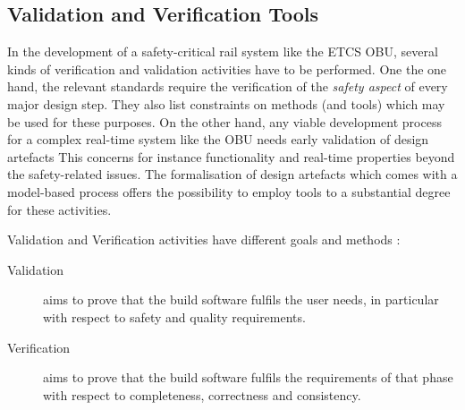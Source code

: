 \documentclass{template/openetcs_article}
\begin{document}
\subsection{Validation and Verification Tools}

In the development of a safety-critical rail system like the ETCS OBU,
several kinds of verification and validation activities have to be
performed. One the one hand, the relevant standards require the
verification of the \emph{safety aspect} of every major design
step. They also list constraints on methods (and tools) which may be used for these
purposes.  On the other hand, any viable development process for a
complex real-time system like the OBU needs early validation of design
artefacts This concerns for instance functionality and real-time
properties beyond the safety-related issues. The formalisation of
design artefacts which comes with a model-based process offers the
possibility to employ tools to a substantial degree for these
activities. 


 


Validation and Verification activities have different goals and methods :
\begin{description}
\item [Validation] aims to prove that the build software fulfils the user needs, in particular with respect to safety and quality requirements.
\item [Verification] aims to prove that the build software fulfils the requirements of that
phase with respect to completeness, correctness and consistency.
\end{description}
\end{document}
